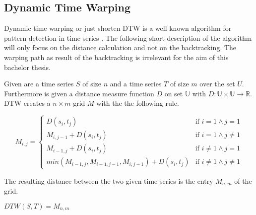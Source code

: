 \subsection{Dynamic Time Warping}
Dynamic time warping or just shorten DTW is a well known algorithm for pattern detection in time series
\cite{berndt1994using}. The following short description of the algorithm will only focus on the distance calculation and
not on the backtracking. The warping path as result of the backtracking is irrelevant for the aim of this bachelor
thesis.

Given are a time series $S$ of size $n$ and a time series $T$ of size $m$ over the set $U$. Furthermore is given a
distance measure function $D$ on set $\mathbb{U}$ with $D: \mathbb{U} \times \mathbb{U} \to \mathbb{R}$. DTW creates a
$n \times m$ grid $M$ with the the following rule.
\begin{center} \[ M_{i, j} = \begin{cases}
    D(s_i,t_j) & \text{if } i = 1 \wedge j = 1\\
    M_{i,j-1} + D(s_i,t_j) & \text{if } i = 1 \wedge j \neq 1\\
    M_{i-1,j} + D(s_i,t_j) & \text{if } i \neq 1 \wedge j = 1\\
    min(M_{i-1,j}, M_{i-1,j-1}, M_{i,j-1}) + D(s_i,t_j) & \text{if } i \neq 1 \wedge j \neq 1
\end{cases} \] \end{center}
The resulting distance between the two given time series is the entry $M_{n,m}$ of the grid.
\begin{center}
    $DTW(S, T) = M_{n,m}$
\end{center}
